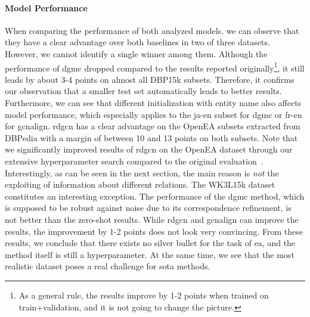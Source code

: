\documentclass[runningheads]{llncs}
\begin{document}
\paragraph{Model Performance}
When comparing the performance of both analyzed models, we can observe that they have a clear advantage over both baselines in two of three datasets. 
However, we cannot identify a single winner among them.
Although the performance of \acrshort{dgmc} dropped compared to the results reported originally\footnote{As a general rule, the results improve by 1-2 points when trained on train+validation, and it is not going to change the picture.}, it still leads by about 3-4 points on almost all DBP15k subsets. 
Therefore, it confirms our observation that a smaller test set automatically leads to better results.
Furthermore, we can see that different initialization with entity name also affects model performance, which especially applies to the ja-en subset for \acrshort{dgmc} or fr-en for \acrshort{gcnalign}.
\acrshort{rdgcn} has a clear advantage on the OpenEA subsets extracted from DBPedia with a margin of between 10 and 13 points on both subsets. 
Note that we significantly improved results of \acrshort{rdgcn} on the OpenEA dataset through our extensive hyperparameter search compared to the original evaluation~\cite{DBLP:journals/pvldb/SunZHWCAL20}.
Interestingly, as can be seen in the next section, the main reason is \emph{not} the exploiting of information about different relations. 
The WK3L15k dataset constitutes an interesting exception.
The performance of the \acrshort{dgmc} method, which is supposed to be robust against noise due to its correspondence refinement, is not better than the zero-shot results. 
While \acrshort{rdgcn} and \acrshort{gcnalign} can improve the results, the improvement by 1-2 points does not look very convincing.
From these results, we conclude that there exists no silver bullet for the task of \gls{ea}, and the method itself is still a hyperparameter.
At the same time, we see that the most realistic dataset poses a real challenge for \gls{sota} methods.
\end{document}
